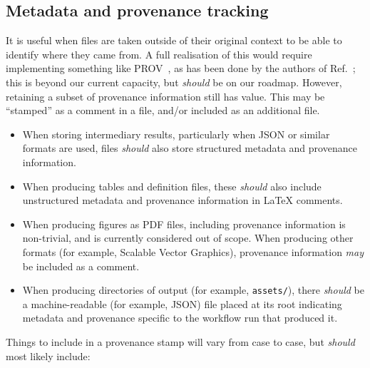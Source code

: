 \documentclass{article}
\newcommand\rfcword[1]{\emph{#1}\xspace}
\newcommand\should{\rfcword{should}}
\newcommand\may{\rfcword{may}}
\newcommand\filename[1]{\texttt{#1}\xspace}
\begin{document}
\subsection{Metadata and provenance tracking}

It is useful
when files are taken outside of their original context
to be able to identify where they came from.
A full realisation of this would require implementing something like PROV~\cite{prov},
as has been done by the authors of Ref.~\cite{Auge:2023vnd};
this is beyond our current capacity,
but \should be on our roadmap.
However,
retaining a subset of provenance information still has value.
This may be ``stamped'' as a comment in a file,
and/or included as an additional file.

\begin{itemize}
  \item
        When storing intermediary results,
        particularly when JSON or similar formats are used,
        files \should also store structured metadata and provenance information.
  \item
        When producing tables and definition files,
        these \should also include
        unstructured metadata and provenance information
        in LaTeX comments.
  \item
        When producing figures as PDF files,
        including provenance information is non-trivial,
        and is currently considered out of scope.
        When producing other formats
        (for example, Scalable Vector Graphics),
        provenance information \may be included as a comment.
  \item
        When producing directories of output
        (for example, \filename{assets/}),
        there \should be a machine-readable
        (for example, JSON)
        file placed at its root
        indicating metadata and provenance specific to the workflow run that produced it.
\end{itemize}

Things to include in a provenance stamp will vary from case to case,
but \should most likely include:
\end{document}
